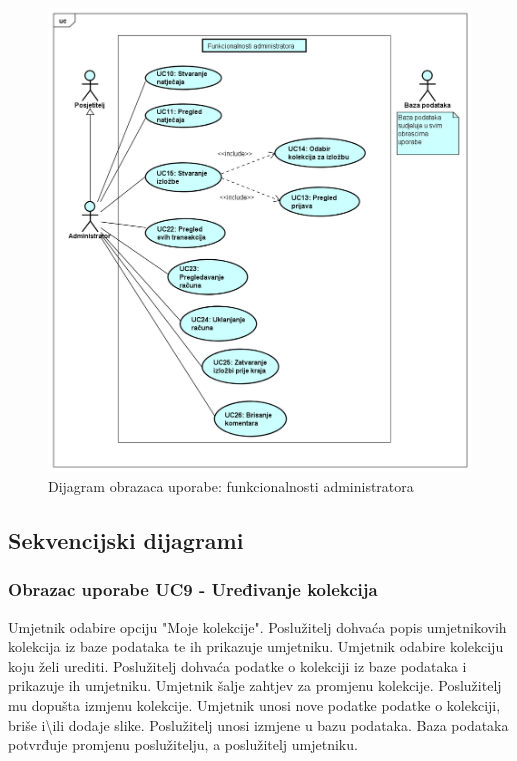 				\begin{figure}[H]
					\includegraphics[width=\textwidth,height=\textheight,keepaspectratio]{uml_3}
					\caption{Dijagram obrazaca uporabe: funkcionalnosti administratora}
				
				\end{figure}
				
				\eject		
				
			\subsection{Sekvencijski dijagrami}
			
			\subsubsection{Obrazac uporabe UC9 - Uređivanje kolekcija}
			
					{Umjetnik odabire opciju "Moje kolekcije". Poslužitelj dohvaća popis umjetnikovih kolekcija iz baze podataka te ih
					prikazuje umjetniku. Umjetnik odabire kolekciju koju želi urediti. Poslužitelj dohvaća podatke o kolekciji iz baze 
					podataka i prikazuje ih umjetniku. Umjetnik šalje zahtjev za promjenu kolekcije. Poslužitelj mu dopušta izmjenu kolekcije. Umjetnik unosi 
					nove podatke podatke o kolekciji,
					briše i\textbackslash ili dodaje slike. Poslužitelj unosi izmjene u bazu podataka. Baza podataka potvrđuje promjenu poslužitelju, a poslužitelj umjetniku.}
			
